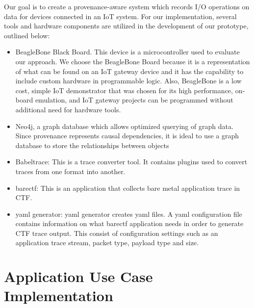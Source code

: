 Our goal is to create a provenance-aware system which records I/O operations on data for devices connected in an IoT system. For our implementation, several tools and hardware components are utilized in the development of our prototype, outlined below:

\begin{itemize}
\item BeagleBone Black Board. This device is a microcontroller used to evaluate our approach. We choose the BeagleBone Board because it is a representation of what can be found on an IoT gateway device and it has the capability to include custom hardware in programmable logic. Also, BeagleBone is a low cost, simple IoT demonstrator that was chosen for its high performance, on­board emulation, and IoT gateway projects can be programmed without additional need for hardware tools.


\item Neo4j, a graph database which allows optimized querying of graph data. Since provenance represents causal dependencies, it is ideal to use a graph database to store the relationships between objects


\item Babeltrace:  This is a trace converter tool. It contains plugins used to convert traces from one format into another. 

\item barectf: This is an application that collects bare metal application trace in CTF.

\item yaml generator: yaml generator creates yaml files. A yaml configuration file contains information on what barectf application needs in order to generate CTF trace output. This consist of configuration settings such as an application trace stream, packet type, payload type and size. 


\end{itemize}


\section{Application Use Case Implementation} \label{use_case_application}

